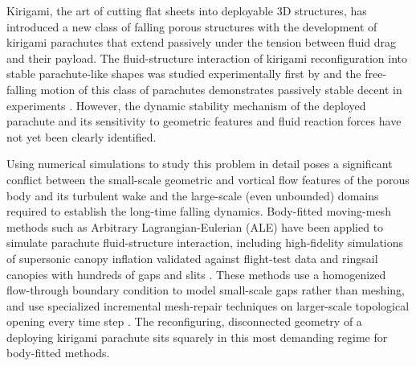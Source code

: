 \documentclass[lineno]{JFM-FLM_Au}
\begin{document}
Kirigami, the art of cutting flat sheets into deployable 3D structures, has introduced a new class of falling porous structures with the development of kirigami parachutes that extend passively under the tension between fluid drag and their payload.
The fluid-structure interaction of kirigami reconfiguration into stable parachute-like shapes was studied experimentally first by \cite{Carleton2024KirigamiFlow} and the free-falling motion of this class of parachutes demonstrates passively stable decent in experiments \citep{Lamoureux2025Kirigami-inspiredReconfiguration}. However, the dynamic stability mechanism of the deployed parachute and its sensitivity to geometric features and fluid reaction forces have not yet been clearly identified.

Using numerical simulations to study this problem in detail poses a significant conflict between the small-scale geometric and vortical flow features of the porous body and its turbulent wake and the large-scale (even unbounded) domains required to establish the long-time falling dynamics. Body-fitted moving-mesh methods such as Arbitrary Lagrangian-Eulerian (ALE) have been applied to simulate parachute fluid-structure interaction, including high-fidelity simulations of supersonic canopy inflation validated against flight-test data \citep{Asad2024SupersonicInflation} and ringsail canopies with hundreds of gaps and slits \citep{Takizawa2013ClustersPorosity}. These methods use a homogenized flow-through boundary condition to model small-scale gaps rather than meshing, and use specialized incremental mesh-repair techniques on larger-scale topological opening every time step \citep{Takizawa2013ClustersPorosity}. The reconfiguring, disconnected geometry of a deploying kirigami parachute sits squarely in this most demanding regime for body-fitted methods. 
\end{document}

